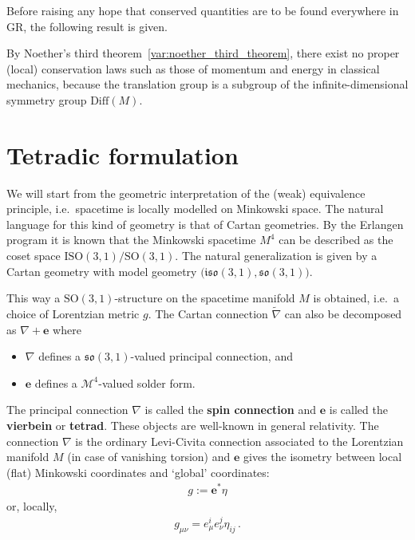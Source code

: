     Before raising any hope that conserved quantities are to be found everywhere in GR, the following result is given.
    \begin{property}
        By Noether's third theorem~\ref{var:noether_third_theorem}, there exist no proper (local) conservation laws such as those of momentum and energy in classical mechanics, because the translation group is a subgroup of the infinite-dimensional symmetry group $\mathrm{Diff}(M)$.
    \end{property}

\section{Tetradic formulation}

    We will start from the geometric interpretation of the (weak) equivalence principle, i.e.~spacetime is locally modelled on Minkowski space. The natural language for this kind of geometry is that of Cartan geometries. By the Erlangen program it is known that the Minkowski spacetime $M^4$ can be described as the coset space $\mathrm{ISO}(3,1)/\mathrm{SO}(3,1)$. The natural generalization is given by a Cartan geometry with model geometry $\bigl(\mathfrak{iso}(3,1),\mathfrak{so}(3,1)\bigr)$.

    \begin{property}
        This way a $\mathrm{SO}(3,1)$-structure on the spacetime manifold $M$ is obtained, i.e.~a choice of Lorentzian metric $g$. The Cartan connection $\widetilde{\nabla}$ can also be decomposed as $\nabla+\mathbf{e}$ where
        \begin{itemize}
            \item $\nabla$ defines a $\mathfrak{so}(3,1)$-valued principal connection, and
            \item $\mathbf{e}$ defines a $\mathcal{M}^4$-valued solder form.
        \end{itemize}
        The principal connection $\nabla$ is called the \textbf{spin connection} and $\mathbf{e}$ is called the \textbf{vierbein} or \textbf{tetrad}. These objects are well-known in general relativity. The connection $\nabla$ is the ordinary Levi-Civita connection associated to the Lorentzian manifold $M$ (in case of vanishing torsion) and $\mathbf{e}$ gives the isometry between local (flat) Minkowski coordinates and `global' coordinates:
        \begin{gather}
            g := \mathbf{e}^*\eta
        \end{gather}
        or, locally,
        \begin{gather}
            g_{\mu\nu} = e^i_\mu e^j_\nu\eta_{ij}\,.
        \end{gather}
    \end{property}

